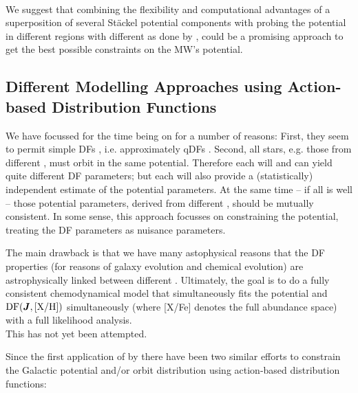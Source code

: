 \\We suggest that combining the flexibility and computational advantages of a superposition of several St\"{a}ckel potential components with probing the potential in different regions with different \MAPs as done by \citet{bov13}, could be a promising approach to get the best possible constraints on the MW's potential.

\subsection{Different Modelling Approaches using Action-based Distribution Functions}

We have focussed for the time being on \MAPs for a number of reasons: First, they seem to permit simple DFs \citep{bov12b,bov12c,bov12d}, i.e. approximately qDFs \citep{tin13}. Second, all stars, e.g. those from different \MAPs, must orbit in the same potential. Therefore each \MAP will and can yield quite different DF parameters; but each \MAP will also provide a (statistically) independent estimate of the potential parameters. At the same time -- if all is well -- those potential parameters, derived from different \MAPs, should be mutually consistent. In some sense, this approach focusses on constraining the potential, treating the DF parameters as nuisance parameters.

The main drawback is that we have many astophysical reasons that the DF properties (for reasons of galaxy evolution and chemical evolution) are astrophysically linked between different \MAPs. Ultimately, the goal is to do a fully consistent chemodynamical model that simultaneously fits the potential and $\text{DF}(\boldsymbol{J},\text{[X/H]})$ simultaneously (where [X/Fe] denotes the full abundance space) with a full likelihood analysis. 
\\This has not yet been attempted. 

Since the first application of \RM by \citet{bov13} there have been two similar efforts to constrain the Galactic potential and/or orbit distribution using action-based distribution functions:

